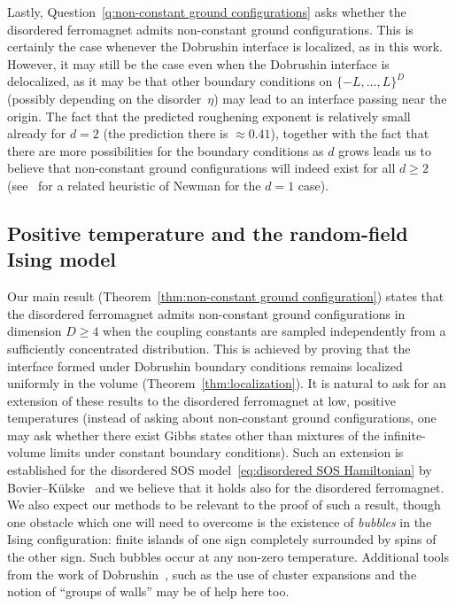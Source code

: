 \documentclass[11pt, reqno]{amsart}
\numberwithin{equation}{section}
\begin{document}
Lastly, Question~\ref{q:non-constant ground configurations} asks whether the disordered ferromagnet admits non-constant ground configurations. This is certainly the case whenever the Dobrushin interface is localized, as in this work. However, it may still be the case even when the Dobrushin interface is delocalized, as it may be that other boundary conditions on $\{-L,\ldots, L\}^D$ (possibly depending on the disorder~$\eta$) may lead to an interface passing near the origin. The fact that the predicted roughening exponent is relatively small already for $d=2$ (the prediction there is $\approx0.41$), together with the fact that there are more possibilities for the boundary conditions as $d$ grows leads us to believe that non-constant ground configurations will indeed exist for all $d\ge 2$ (see~\cite[Section 4.5.1]{ADH17} for a related heuristic of Newman for the $d=1$ case).

\subsection{Positive temperature and the random-field Ising model}\label{sec:positive temperature and RFIM} 
Our main result (Theorem~\ref{thm:non-constant ground configuration}) states that the disordered ferromagnet admits non-constant ground configurations in dimension $D\ge 4$ when the coupling constants are sampled independently from a sufficiently concentrated distribution. This is achieved by proving that the interface formed under Dobrushin boundary conditions remains localized uniformly in the volume (Theorem~\ref{thm:localization}). It is natural to ask for an extension of these results to the disordered ferromagnet at low, positive temperatures (instead of asking about non-constant ground configurations, one may ask whether there exist Gibbs states other than mixtures of the infinite-volume limits under constant boundary conditions). Such an extension is established for the disordered SOS model~\eqref{eq:disordered SOS Hamiltonian} by Bovier--K\"ulske~\cite{BK} and we believe that it holds also for the disordered ferromagnet. We also expect our methods to be relevant to the proof of such a result, though one obstacle which one will need to overcome is the existence of \emph{bubbles} in the Ising configuration: finite islands of one sign completely surrounded by spins of the other sign. Such bubbles occur at any non-zero temperature. Additional tools from the work of Dobrushin~\cite{Dob}, such as the use of cluster expansions and the notion of ``groups of walls'' may be of help here too.
\end{document}
